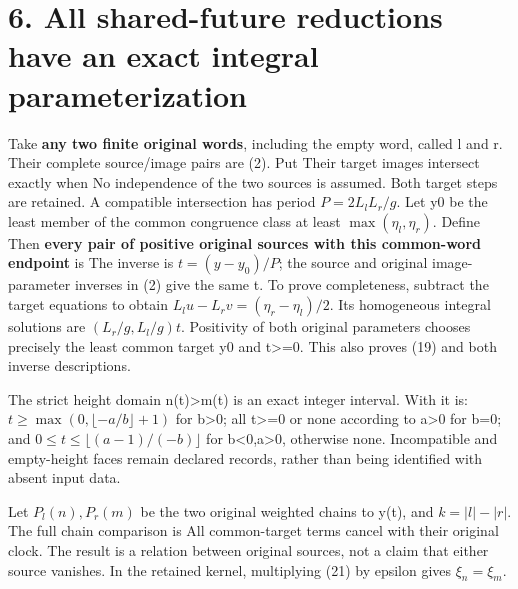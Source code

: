 \section{6. All shared-future reductions have an exact integral
parameterization}

Take \textbf{any two finite original words}, including the empty word,
called l and r. Their complete source/image pairs are (2). Put
 Their target images
intersect exactly when  No
independence of the two sources is assumed. Both target steps are
retained. A compatible intersection has period \(P=2L_lL_r/g\). Let y0
be the least member of the common congruence class at least
\(\max(\eta_l,\eta_r)\). Define
 Then
\textbf{every pair of positive original sources with this common-word
endpoint} is  The inverse is \(t=(y-y_0)/P\); the source and
original image-parameter inverses in (2) give the same t. To prove
completeness, subtract the target equations to obtain
\(L_lu-L_rv=(\eta_r-\eta_l)/2\). Its homogeneous integral solutions are
\((L_r/g,L_l/g)t\). Positivity of both original parameters chooses
precisely the least common target y0 and t\textgreater=0. This also
proves (19) and both inverse descriptions.

The strict height domain n(t)\textgreater m(t) is an exact integer
interval. With  it
is: \(t\ge\max(0,\lfloor-a/b\rfloor+1)\) for b\textgreater0; all
t\textgreater=0 or none according to a\textgreater0 for b=0; and
\(0\le t\le\lfloor(a-1)/(-b)\rfloor\) for b\textless0,a\textgreater0,
otherwise none. Incompatible and empty-height faces remain declared
records, rather than being identified with absent input data.

Let \(P_l(n),P_r(m)\) be the two original weighted chains to y(t), and
\(k=|l|-|r|\). The full chain comparison is
All common-target terms cancel with their original clock. The result is
a relation between original sources, not a claim that either source
vanishes. In the retained kernel, multiplying (21) by epsilon gives
\(\xi_n=\xi_m\).


